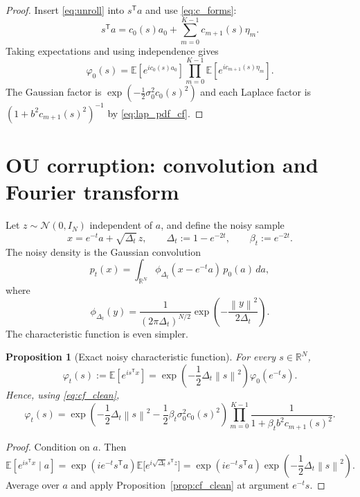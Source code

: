 \documentclass[11pt]{article}
\newtheorem{proposition}{Proposition}[section]
\newcommand{\R}{\mathbb{R}}
\newcommand{\E}{\mathbb{E}}
\newcommand{\Id}{I}
\newcommand{\trans}{\mathsf{T}}
\newcommand{\Ncal}{\mathcal{N}}
\newcommand{\norm}[1]{\left\lVert #1 \right\rVert}
\begin{document}
\begin{proof}
Insert \eqref{eq:unroll} into $s^\trans a$ and use \eqref{eq:c_forms}:
\[
 s^\trans a=c_0(s)a_0+\sum_{m=0}^{K-1}c_{m+1}(s)\eta_m.
\]
Taking expectations and using independence gives
\[
\varphi_0(s)=\E[e^{ic_0(s)a_0}]\prod_{m=0}^{K-1}\E[e^{ic_{m+1}(s)\eta_m}].
\]
The Gaussian factor is $\exp(-\tfrac12\sigma_0^2 c_0(s)^2)$ and each Laplace factor is $(1+b^2c_{m+1}(s)^2)^{-1}$ by \eqref{eq:lap_pdf_cf}.
\end{proof}

\section{OU corruption: convolution and Fourier transform}
Let $z\sim\Ncal(0,\Id_N)$ independent of $a$, and define the noisy sample
\begin{equation}\label{eq:xt_def}
 x=e^{-t}a+\sqrt{\Delta_t}\,z,
 \qquad
 \Delta_t:=1-e^{-2t},
 \qquad
 \beta_t:=e^{-2t}.
\end{equation}
The noisy density is the Gaussian convolution
\begin{equation}\label{eq:conv}
 p_t(x)=\int_{\R^N}\phi_{\Delta_t}(x-e^{-t}a)\,p_0(a)\,da,
\end{equation}
where
\[
\phi_{\Delta_t}(y)=\frac{1}{(2\pi\Delta_t)^{N/2}}\exp\!\left(-\frac{\norm{y}^2}{2\Delta_t}\right).
\]
The characteristic function is even simpler.
\begin{proposition}[Exact noisy characteristic function]\label{prop:cf_noisy}
For every $s\in\R^N$,
\begin{equation}\label{eq:cf_noisy}
\varphi_t(s)
:=
\E[e^{is^\trans x}]
=
\exp\!\left(-\frac12\Delta_t\norm{s}^2\right)\varphi_0(e^{-t}s).
\end{equation}
Hence, using \eqref{eq:cf_clean},
\begin{equation}\label{eq:cf_noisy_explicit}
\varphi_t(s)=
\exp\!\left(-\frac12\Delta_t\norm{s}^2-\frac12\beta_t\sigma_0^2 c_0(s)^2\right)
\prod_{m=0}^{K-1}\frac{1}{1+\beta_t b^2 c_{m+1}(s)^2}.
\end{equation}
\end{proposition}

\begin{proof}
Condition on $a$. Then
\[
\E[e^{is^\trans x}\mid a]
=
\exp(i e^{-t}s^\trans a)
\E\big[e^{i\sqrt{\Delta_t}s^\trans z}\big]
=
\exp(i e^{-t}s^\trans a)\exp\!\left(-\frac12\Delta_t\norm{s}^2\right).
\]
Average over $a$ and apply Proposition~\ref{prop:cf_clean} at argument $e^{-t}s$.
\end{proof}
\end{document}
